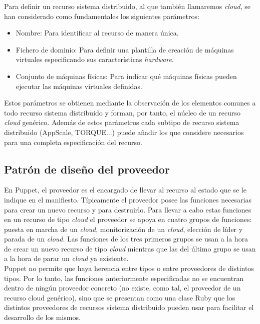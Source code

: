 Para definir un recurso sistema distribuido, al que también llamaremos \emph{cloud}, se han considerado como fundamentales los siguientes parámetros:

\begin{itemize}
\item Nombre: Para identificar al recurso de manera única.
\item Fichero de dominio: Para definir una plantilla de creación de máquinas virtuales especificando sus características \emph{hardware}.
\item Conjunto de máquinas físicas: Para indicar qué máquinas físicas pueden ejecutar las máquinas virtuales definidas.
\end{itemize}

Estos parámetros se obtienen mediante la observación de los elementos comunes a todo recurso sistema distribuido y forman, por tanto, el núcleo de un recurso \emph{cloud} genérico. Además de estos parámetros cada subtipo de recurso sistema distribuido (AppScale, TORQUE...) puede añadir los que considere necesarios para una completa especificación del recurso.


\subsection{Patrón de diseño del proveedor}

En Puppet, el proveedor es el encargado de llevar al recurso al estado que se le indique en el manifiesto. Típicamente el proveedor posee las funciones necesarias para crear un nuevo recurso y para destruirlo. Para llevar a cabo estas funciones en un recurso de tipo \emph{cloud} el proveedor se apoya en cuatro grupos de funciones: puesta en marcha de un \emph{cloud}, monitorización de un \emph{cloud}, elección de líder y parada de un \emph{cloud}. Las funciones de los tres primeros grupos se usan a la hora de crear un nuevo recurso de tipo \emph{cloud} mientras que las del último grupo se usan a la hora de parar un \emph{cloud} ya existente. \\

Puppet no permite que haya herencia entre tipos o entre proveedores de distintos tipos. Por lo tanto, las funciones anteriormente especificadas no se encuentran dentro de ningún proveedor concreto (no existe, como tal, el proveedor de un recurso cloud genérico), sino que se presentan como una clase Ruby que los distintos proveedores de recursos sistema distribuido pueden usar para facilitar el desarrollo de los mismos. \\

